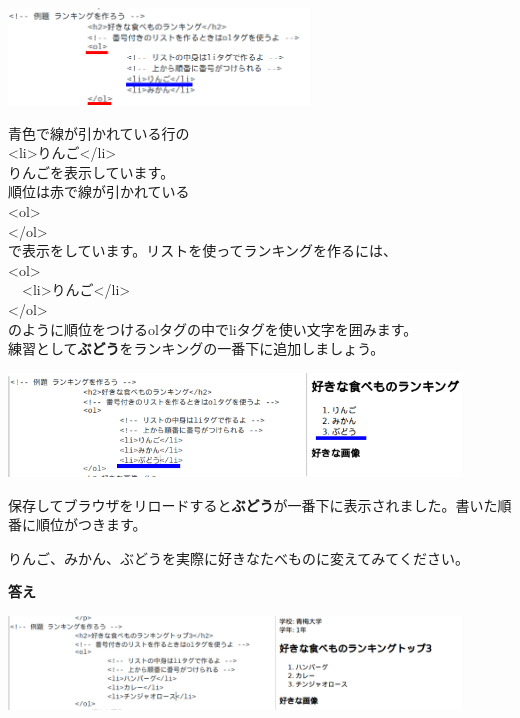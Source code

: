 \documentclass[a4paper,12pt]{jarticle}
\begin{document}
\includegraphics[width=0.6\textwidth]{textbook-img181.png}


青色で線が引かれている行の\\
{\textless}li{\textgreater}りんご{\textless}/li{\textgreater}\\
りんごを表示しています。\\
順位は赤で線が引かれている\\
{\textless}ol{\textgreater}\\
{\textless}/ol{\textgreater}\\
で表示をしています。リストを使ってランキングを作るには、\\
{\textless}ol{\textgreater}\\
\ \ {\textless}li{\textgreater}りんご{\textless}/li{\textgreater}\\
{\textless}/ol{\textgreater}\\
のように順位をつけるolタグの中でliタグを使い文字を囲みます。\\
練習として\textbf{ぶどう}をランキングの一番下に追加しましょう。\\


\bigskip


\includegraphics[width=0.9\textwidth]{textbook-img183.png}


\bigskip


保存してブラウザをリロードすると\textbf{ぶどう}が一番下に表示されました。書いた順番に順位がつきます。

りんご、みかん、ぶどうを実際に好きなたべものに変えてみてください。


\bigskip
\clearpage
\textbf{答え}


\bigskip



\includegraphics[width=0.9\textwidth]{textbook-img184.png}
\end{document}
